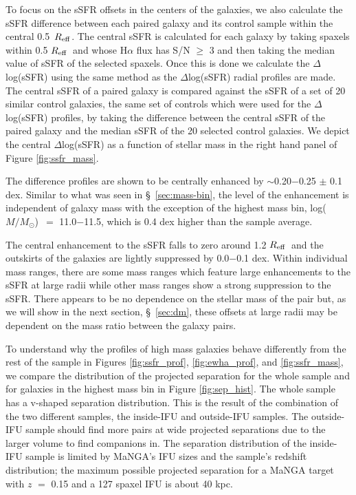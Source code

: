 \documentclass[apj,twocolumn]{emulateapj}
\newcommand{\reff}{$R_{\rm eff}$}
\newcommand{\logm}{log($M/M_{\odot}$)}
\begin{document}
\begin{CJK*}{UTF8}{gbsn}
To focus on the sSFR offsets in the centers of the galaxies, we also calculate the sSFR difference between each paired galaxy and its control sample within the central 0.5~\reff. The central sSFR is calculated for each galaxy by taking spaxels within 0.5 \reff\ and whose H$\alpha$ flux has S/N $\ge$ 3 and then taking the median value of sSFR of the selected spaxels. Once this is done we calculate the $\Delta$log(sSFR) using the same method as the $\Delta$log(sSFR) radial profiles are made. The central sSFR of a paired galaxy is compared against the sSFR of a set of 20 similar control galaxies, the same set of controls which were used for the $\Delta$log(sSFR) profiles, by taking the difference between the central sSFR of the paired galaxy and the median sSFR of the 20 selected control galaxies. We depict the central $\Delta$log(sSFR) as a function of stellar mass in the right hand panel of Figure \ref{fig:ssfr_mass}.

The difference profiles are shown to be centrally enhanced by $\sim$0.20$-$0.25 $\pm$ 0.1 dex. Similar to what was seen in \S~\ref{sec:mass-bin}, the level of the enhancement is independent of galaxy mass with the exception of the highest mass bin, \logm\ $=$ 11.0$-$11.5, which is 0.4 dex higher than the sample average. 

The central enhancement to the sSFR falls to zero around 1.2 \reff\ and the outskirts of the galaxies are lightly suppressed by 0.0$-$0.1 dex. Within individual mass ranges, there are some mass ranges which feature large enhancements to the sSFR at large radii while other mass ranges show a strong suppression to the sSFR. There appears to be no dependence on the stellar mass of the pair but, as we will show in the next section, \S~\ref{sec:dm}, these offsets at large radii may be dependent on the mass ratio between the galaxy pairs.

To understand why the profiles of high mass galaxies behave differently from the rest of the sample in Figures \ref{fig:ssfr_prof}, \ref{fig:ewha_prof}, and \ref{fig:ssfr_mass}, we compare the distribution of the projected separation for the whole sample and for galaxies in the highest mass bin in Figure \ref{fig:sep_hist}. The whole sample has a v-shaped separation distribution. This is the result of the combination of the two different samples, the inside-IFU and outside-IFU samples. The outside-IFU sample should find more pairs at wide projected separations due to the larger volume to find companions in. The separation distribution of the inside-IFU sample is limited by MaNGA's IFU sizes and the sample's redshift distribution; the maximum possible projected separation for a MaNGA target with $z$ $=$ 0.15 and a 127 spaxel IFU is about 40 kpc. 


\end{CJK*}
\end{document}
